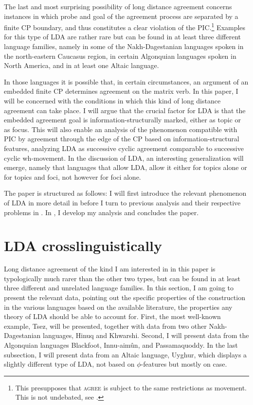 \documentclass[output=paper
,modfonts
,nonflat]{langsci/langscibook}
\begin{document}
The last and most surprising possibility of long distance agreement concerns instances in which probe and goal of the agreement process are separated by a finite CP boundary, and thus constitutes a clear violation of the PIC.\footnote{This presupposes that \textsc{agree} is subject to the same restrictions as movement. This is not undebated, see \citet{Boskovic2003,Boskovic2007}.} Examples for this type of LDA are rather rare but can be found in at least three different language families, namely in some of the Nakh-Dagestanian languages spoken in the north-eastern Caucasus region, in certain Algonquian languages spoken in North America, and in at least one Altaic language.

In those languages it is possible that, in certain circumstances, an argument of an embedded finite CP determines agreement on the matrix verb. In this paper, I will be concerned with the conditions in which this kind of long distance agreement can take place. I will argue that the crucial factor for LDA is that the embedded agreement goal is information-structurally marked, either as topic or as focus. This will also enable an analysis of the phenomenon compatible with PIC by agreement through the edge of the CP based on information-structural features, analyzing LDA as successive cyclic agreement comparable to successive cyclic wh-movement. In the discussion of LDA, an interesting generalization will emerge, namely that languages that allow LDA, allow it either for topics alone or for topics and foci, not however for foci alone.

The paper is structured as follows: I will first introduce the relevant phenomenon of LDA in more detail in  before I turn to previous analysis and their respective problems in . In , I develop my analysis and  concludes the paper.\largerpage[-1]

\section{LDA crosslinguistically}
\label{sec:mursell:2}

Long distance agreement of the kind I am interested in in this paper is typologically much rarer than the other two types, but can be found in at least three different and unrelated language families. In this section, I am going to present the relevant data, pointing out the specific properties of the construction in the various languages based on the available literature, the properties any theory of LDA should be able to account for. First, the most well-known example, Tsez, will be presented, together with data from two other Nakh-Dagestanian languages, Hinuq and Khwarshi. Second, I will present data from the Algonquian languages Blackfoot, Innu-aim\^{u}n, and Passamaquoddy. In the last subsection, I will present data from an Altaic language, Uyghur, which displays a slightly different type of LDA, not based on $ \phi $-features but mostly on case.
\end{document}
